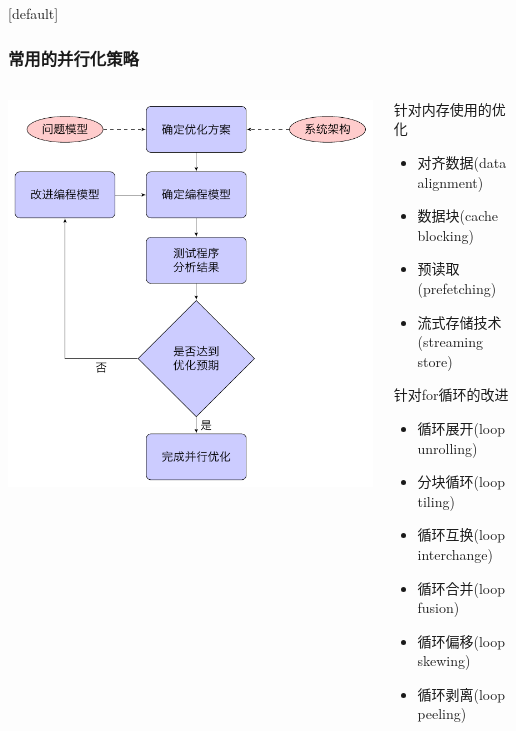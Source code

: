 \documentclass{beamer}
\makeatletter
\newenvironment{withoutheadline}{
  \setbeamertemplate{headline}[default]
  \def\beamer@entrycode{\vspace*{-\headheight}}
}{}
\makeatother
\begin{document}
\begin{withoutheadline}
\begin{frame}
	\frametitle{常用的并行化策略}
	\begin{columns}
		\begin{column}[T]{0.48\textwidth}
			\includegraphics[width=\textwidth]{Figures/algorithm/tikz/flowchart1.pdf}
		\end{column}\hfill
		\begin{column}[T]{0.48\textwidth}
				 针对内存使用的优化
					\begin{itemize}
						\item 对齐数据(data alignment)
						\item 数据块(cache blocking)
						\item 预读取(prefetching)
						\item 流式存储技术(streaming store)
					\end{itemize}
				 针对for循环的改进
					\begin{itemize}
						\item 循环展开(loop unrolling)
						\item 分块循环(loop tiling)
						\item 循环互换(loop interchange)
						\item 循环合并(loop fusion)
						\item 循环偏移(loop skewing)
						\item 循环剥离(loop peeling)
					\end{itemize}
		\end{column}
	\end{columns}
	\end{frame}
\end{withoutheadline}
\end{document}
